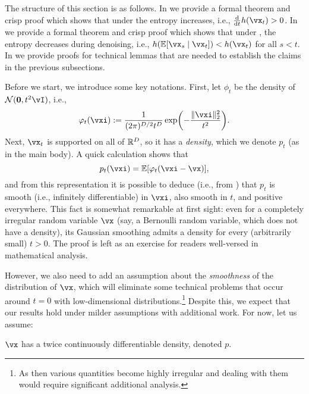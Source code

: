 \documentclass[../../book-main.tex]{subfiles}
\begin{document}
The structure of this section is as follows. In  we provide a formal theorem and crisp proof which shows that under  the entropy increases, i.e., \(\odv*{h(\vx_{t})}{t} > 0\). In  we provide a formal theorem and crisp proof which shows that under , the entropy decreases during denoising, i.e., \(h(\Ex[\vx_{s} \given \vx_{t}]) < h(\vx_{t})\) for all \(s < t\). In  we provide proofs for technical lemmas that are needed to establish the claims in the previous subsections.

Before we start, we introduce some key notations. First, let \(\phi_{t}\) be the density of \(\dNorm(\vzero, t^{2}\vI)\), i.e.,
\begin{equation}\label{eq:gaussian_noise_time_t}
    \phi_{t}(\vxi) := \frac{1}{(2\pi)^{D/2}t^{D}}\exp\rp{-\frac{\norm{\vxi}_{2}^{2}}{t^{2}}}.
\end{equation}
Next, \(\vx_{t}\) is supported on all of \(\mathbb{R}^{D}\), so it has a \textit{density}, which we denote \(p_{t}\) (as in the main body). A quick calculation shows that
\begin{equation}\label{eq:p_t_representation}
    p_{t}(\vxi) = \Ex[\phi_{t}(\vxi - \vx)],
\end{equation}
and from this representation it is possible to deduce (i.e., from ) that \(p_{t}\) is smooth (i.e., infinitely differentiable) in \(\vxi\), also smooth in \(t\), and positive everywhere. This fact is somewhat remarkable at first sight: even for a completely irregular random variable \(\vx\) (say, a Bernoulli random variable, which does not have a density), its Gaussian smoothing admits a density for every (arbitrarily small) \(t > 0\). The proof is left as an exercise for readers well-versed in mathematical analysis.

However, we also need to add an assumption about the \textit{smoothness} of the distribution of \(\vx\), which will eliminate some technical problems that occur around \(t = 0\) with low-dimensional distributions.\footnote{As then various quantities become highly irregular and dealing with them would require significant additional analysis.} Despite this, we expect that our results hold under milder assumptions with additional work. For now, let us assume:
\begin{assumption}\label{assumption:entropy_x_density}
    \(\vx\) has a twice continuously differentiable density, denoted \(p\).
\end{assumption}
\end{document}
